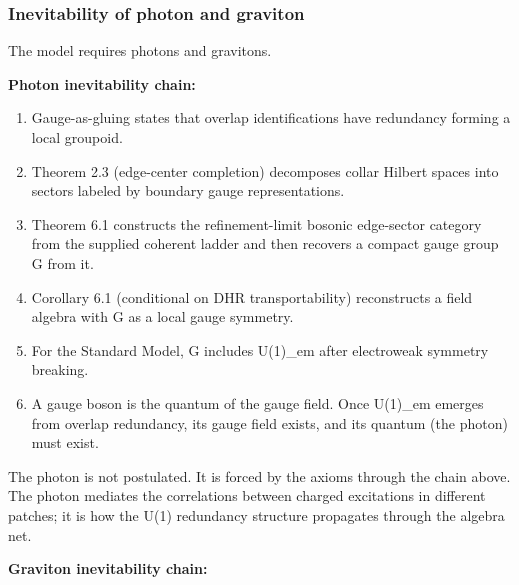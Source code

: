 \subsubsection{Inevitability of photon and graviton}\label{611-inevitability-of-photon-and-graviton}

The model requires photons and gravitons.

\textbf{Photon inevitability chain:}

\begin{enumerate}
\def\labelenumi{\arabic{enumi}.}
\tightlist
\item
  Gauge-as-gluing states that overlap identifications have redundancy forming a local groupoid.
\item
  Theorem 2.3 (edge-center completion) decomposes collar Hilbert spaces into sectors labeled by boundary gauge representations.
\item
  Theorem 6.1 constructs the refinement-limit bosonic edge-sector category from the supplied coherent ladder and then recovers a compact gauge group G from it.
\item
  Corollary 6.1 (conditional on DHR transportability) reconstructs a field algebra with G as a local gauge symmetry.
\item
  For the Standard Model, G includes U(1)\_em after electroweak symmetry breaking.
\item
  A gauge boson is the quantum of the gauge field. Once U(1)\_em emerges from overlap redundancy, its gauge field exists, and its quantum (the photon) must exist.
\end{enumerate}

The photon is not postulated. It is forced by the axioms through the chain above. The photon mediates the correlations between charged excitations in different patches; it is how the U(1) redundancy structure propagates through the algebra net.

\textbf{Graviton inevitability chain:}

